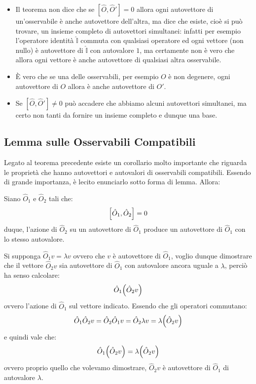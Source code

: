 \begin{itemize}
	\item Il teorema non dice che se $[\hat{O}, \hat{O}'] = 0$ allora ogni autovettore di un'osservabile è anche autovettore dell'altra, ma dice che esiste, cioè si può trovare, un insieme completo di autovettori simultanei: infatti per esempio l'operatore identità $\hat{\mathbb{I}}$ commuta con qualsiasi operatore ed ogni vettore (non nullo) è autovettore di $\hat{\mathbb{I}}$ con autovalore $1$, ma certamente non è vero che allora ogni vettore è anche autovettore di qualsiasi altra osservabile.
	\item È vero che se una delle osservabili, per esempio $O$ è non degenere, ogni autovettore di $O$ allora è anche autovettore di $O'$.
	\item Se $[\hat{O}, \hat{O}'] \neq 0$ può accadere che abbiamo alcuni autovettori simultanei, ma certo non tanti da fornire un insieme completo e dunque una base.
\end{itemize}
	
	
\subsection{Lemma sulle Osservabili Compatibili}

	Legato al teorema precedente esiste un corollario molto importante che riguarda le proprietà che hanno autovettori e autovalori di osservabili compatibili. Essendo di grande importanza, è lecito enunciarlo sotto forma di lemma. Allora:

\begin{myprop}
	Siano $\hat{O}_1$ e $\hat{O}_2$ tali che:
\begin{align*}
	\qty[\hat{O}_1, \hat{O}_2] = 0
\end{align*}
	duque, l'azione di $\hat{O}_2$ su un autovettore di $\hat{O}_1$ produce un autovettore di $\hat{O}_1$ con lo stesso autovalore.
\end{myprop}

\begin{myprf}
	Si supponga $\hat{O}_1 v = \lambda v$ ovvero che $v$ è autovettore di $\hat{O}_1$, voglio dunque dimostrare che il vettore $\hat{O}_2v$ sia autovettore di $\hat{O}_1$ con autovalore ancora uguale a $\lambda$, perciò ha senso calcolare:
\begin{align*}
	\hat{O}_1\qty(\hat{O}_2v)
\end{align*}
	ovvero l'azione di $\hat{O}_1$ sul vettore indicato. Essendo che gli operatori commutano:
\begin{align*}
	\hat{O}_1\hat{O}_2v = \hat{O}_2\hat{O}_1 v = \hat{O}_2 \lambda v = \lambda \qty(\hat{O}_2v)
\end{align*}
	e quindi vale che:
\begin{align*}
	\hat{O}_1\qty(\hat{O}_2v) =  \lambda \qty(\hat{O}_2v)
\end{align*}
	ovvero proprio quello che volevamo dimostrare, $\hat{O}_2v$ è autovettore di $\hat{O}_1$ di autovalore $\lambda$.
\end{myprf}

